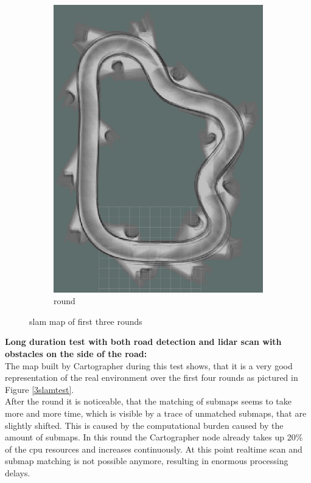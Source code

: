\begin{figure}[H]
\begin{subfigure}{.3\linewidth}
		\includegraphics[width=\textwidth]{Pictures/2slamtest3}
		\caption{ round}
	\end{subfigure}

	\caption{slam map of first three rounds}
	\label{2slamtest}

\end{figure}



\textbf{Long duration test with both road detection and lidar scan with obstacles on the side of the road:}\\

The map built by Cartographer during this test shows, that it is a very good representation of the real environment over the first four rounds as pictured in Figure \ref{3slamtest}.\\

After the  round it is noticeable, that the matching of submaps seems to take more and more time, which is visible by a trace of unmatched submaps, that are slightly shifted. This is caused by the computational burden caused by the amount of submaps. In this round the Cartographer node already takes up 20\% of the cpu resources and increases continuously. At this point realtime scan and submap matching is not possible anymore, resulting in enormous processing delays.

